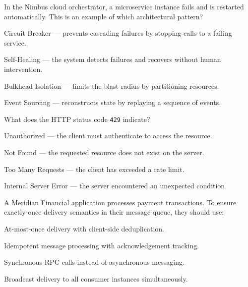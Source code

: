 \documentclass[11pt,a4paper]{article}
\begin{document}
\begin{questionblock}
 In the Nimbus cloud orchestrator, a microservice instance fails and is restarted automatically. This is an example of which architectural pattern?
\begin{mcoptions}
  \item[\textbf{A.}] Circuit Breaker --- prevents cascading failures by stopping calls to a failing service.
  \item[\textbf{B.}] Self-Healing --- the system detects failures and recovers without human intervention.
  \item[\textbf{C.}] Bulkhead Isolation --- limits the blast radius by partitioning resources.
  \item[\textbf{D.}] Event Sourcing --- reconstructs state by replaying a sequence of events.
\end{mcoptions}
\end{questionblock}

\begin{questionblock}
 What does the HTTP status code \texttt{429} indicate?
\begin{mcoptions}
  \item[\textbf{A.}] Unauthorized --- the client must authenticate to access the resource.
  \item[\textbf{B.}] Not Found --- the requested resource does not exist on the server.
  \item[\textbf{C.}] Too Many Requests --- the client has exceeded a rate limit.
  \item[\textbf{D.}] Internal Server Error --- the server encountered an unexpected condition.
\end{mcoptions}
\end{questionblock}

\begin{questionblock}
 A Meridian Financial application processes payment transactions. To ensure exactly-once delivery semantics in their message queue, they should use:
\begin{mcoptions}
  \item[\textbf{A.}] At-most-once delivery with client-side deduplication.
  \item[\textbf{B.}] Idempotent message processing with acknowledgement tracking.
  \item[\textbf{C.}] Synchronous RPC calls instead of asynchronous messaging.
  \item[\textbf{D.}] Broadcast delivery to all consumer instances simultaneously.
\end{mcoptions}
\end{questionblock}
\end{document}
